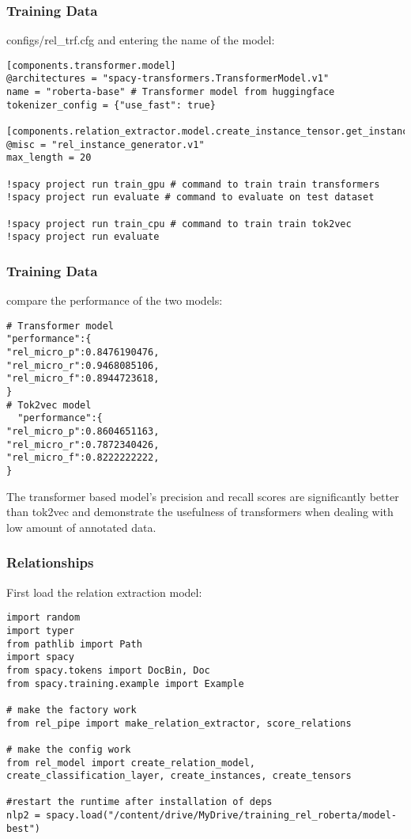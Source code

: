 \begin{frame}[fragile]\frametitle{Training Data}

configs/rel\_trf.cfg and entering the name of the model:

\begin{lstlisting}
[components.transformer.model]
@architectures = "spacy-transformers.TransformerModel.v1"
name = "roberta-base" # Transformer model from huggingface
tokenizer_config = {"use_fast": true}

[components.relation_extractor.model.create_instance_tensor.get_instances]
@misc = "rel_instance_generator.v1"
max_length = 20

!spacy project run train_gpu # command to train train transformers
!spacy project run evaluate # command to evaluate on test dataset

!spacy project run train_cpu # command to train train tok2vec
!spacy project run evaluate
\end{lstlisting}

\end{frame}

\begin{frame}[fragile]\frametitle{Training Data}

compare the performance of the two models:

\begin{lstlisting}
# Transformer model
"performance":{
"rel_micro_p":0.8476190476,
"rel_micro_r":0.9468085106,
"rel_micro_f":0.8944723618,
}
# Tok2vec model
  "performance":{
"rel_micro_p":0.8604651163,
"rel_micro_r":0.7872340426,
"rel_micro_f":0.8222222222,
}
\end{lstlisting}

The transformer based model’s precision and recall scores are significantly better than tok2vec and demonstrate the usefulness of transformers when dealing with low amount of annotated data.

\end{frame}



\begin{frame}[fragile]\frametitle{Relationships}

First load the relation extraction model:

\begin{lstlisting}
import random
import typer
from pathlib import Path
import spacy
from spacy.tokens import DocBin, Doc
from spacy.training.example import Example

# make the factory work
from rel_pipe import make_relation_extractor, score_relations

# make the config work
from rel_model import create_relation_model, create_classification_layer, create_instances, create_tensors

#restart the runtime after installation of deps
nlp2 = spacy.load("/content/drive/MyDrive/training_rel_roberta/model-best")
\end{lstlisting}
	 
\end{frame}


